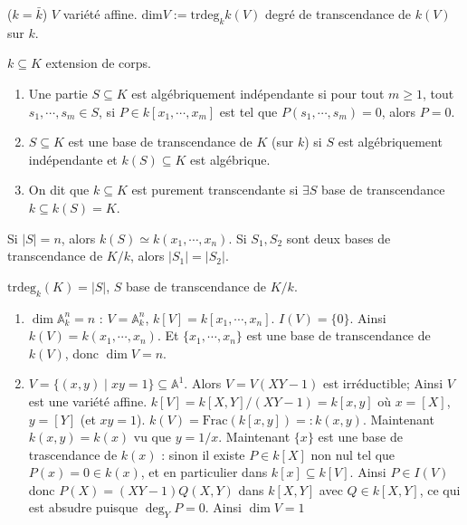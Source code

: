         \begin{defi} ($k = \bar k$)
            $V$ variété affine. $\mathrm{dim} V := \mathrm{trdeg}_k k(V)$ degré de transcendance de $k(V)$ sur $k$.
        \end{defi}
        \begin{defi}
            $k \subseteq K$ extension de corps.
            \begin{enumerate}
                \item Une partie $S \subseteq K$ est algébriquement indépendante si pour tout $m \geq 1$, tout $s_1, \cdots, s_m \in S$, si $P \in k[x_1, \cdots, x_m]$ est tel que $P(s_1, \cdots, s_m) = 0$, alors $P = 0$.
                \item $S \subseteq K$ est une base de transcendance de $K$ (sur $k$) si $S$ est algébriquement indépendante et $k(S) \subseteq K$ est algébrique.
                \item On dit que $k \subseteq K$ est purement transcendante si $\exists S$ base de transcendance $k \subseteq k(S) = K$.
            \end{enumerate}
        \end{defi}
        \begin{remq}
            Si $|S| = n$, alors $k(S) \simeq k(x_1, \cdots, x_n)$. Si $S_1,S_2$ sont deux bases de transcendance de $K/k$, alors $|S_1| = |S_2|$. 
        \end{remq}
        \begin{defi}
            $\mathrm{trdeg}_k(K) = |S|$, $S$ base de transcendance de $K/k$.
        \end{defi}
        \begin{expl}
            \begin{enumerate}
                \item $\dim \mathbb{A}_k^n = n$ : $V = \mathbb{A}_k^n$, $k[V] = k[x_1, \cdots, x_n]$. $I(V) = \{0\}$. Ainsi $k(V) = k(x_1, \cdots, x_n)$. Et $\{x_1, \cdots, x_n\}$ est une base de transcendance de $k(V)$, donc $\dim V = n$.
                \item $V = \{(x,y) \mid xy = 1\} \subseteq \mathbb{A}^1$. Alors $V = V(XY - 1)$ est irréductible; Ainsi $V$ est une variété affine. $k[V] = k[X,Y]/(XY - 1) = k[x,y]$ où $x = [X]$, $y = [Y]$ (et $xy = 1$). $k(V) = \mathrm{Frac} (k[x,y]) =: k(x,y)$. Maintenant $k(x,y) = k(x)$ vu que $y = 1/x$. Maintenant $\{x\}$ est une base de trascendance de $k(x)$ : sinon il existe $P \in k[X]$ non nul tel que $P(x) = 0 \in k(x)$, et en particulier dans $k[x] \subseteq k[V]$. Ainsi $P \in I(V)$ donc $P(X) = (XY - 1)Q(X,Y)$ dans $k[X,Y]$ avec $Q \in k[X,Y]$, ce qui est absudre puisque $\deg_YP = 0$. Ainsi $\dim V = 1$
            \end{enumerate} 
        \end{expl}
